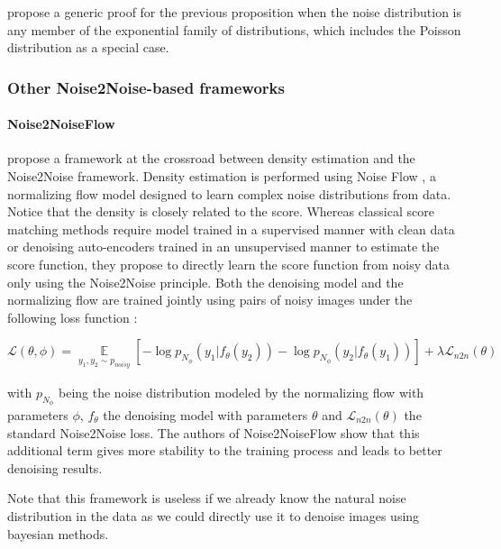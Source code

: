 \cite{gr2r} propose a generic proof for the previous proposition when the noise distribution is any member of the exponential family of distributions, which includes the Poisson distribution as a special case.

\subsubsection{Other Noise2Noise-based frameworks}

\paragraph{Noise2NoiseFlow}

\cite{maleky_noise2noiseflow_2022} propose a framework at the crossroad between density estimation and the Noise2Noise framework. Density estimation is performed using Noise Flow \cite{abdelhamed_noise_2019}, a normalizing flow model designed to learn complex noise distributions from data.
Notice that the density is closely related to the score.
Whereas classical score matching methods require model trained in a supervised manner with clean data or denoising auto-encoders trained in an unsupervised manner to estimate the score function, they propose to directly learn the score function from noisy data only using the Noise2Noise principle.
Both the denoising model and the normalizing flow are trained jointly using pairs of noisy images under the following loss function :

\begin{equation}
    \mathcal{L}(\theta, \phi) =  \underset{\substack{y_1, y_2 \sim p_{noisy}}}{\mathbb{E}} \left[ - \log p_{N_\phi}(y_1 | f_\theta(y_2)) - \log p_{N_\phi}(y_2 | f_\theta(y_1)) \right] + \lambda \mathcal{L}_{n2n}(\theta)
\end{equation}

with $p_{N_\phi}$ being the noise distribution modeled by the normalizing flow with parameters $\phi$, $f_\theta$ the denoising model with parameters $\theta$ and $\mathcal{L}_{n2n}(\theta)$ the standard Noise2Noise loss. The authors of Noise2NoiseFlow show that this additional term gives more stability to the training process and leads to better denoising results.

Note that this framework is useless if we already know the natural noise distribution in the data as we could directly use it to denoise images using bayesian methods.

